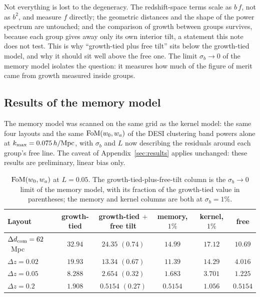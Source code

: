 \documentclass[11pt]{article}
\begin{document}
Not everything is lost to the degeneracy.  The redshift-space terms
scale as $b\,f$, not as $b^2$, and measure $f$ directly; the
geometric distances and the shape of the power spectrum are
untouched; and the comparison of growth between groups survives,
because each group gives away only its own interior tilt, a
statement this note does not test.  This is
why ``growth-tied plus free tilt'' sits below the growth-tied model,
and why it should sit well above the free one.  The limit
$\sigma_b \to 0$ of the memory model isolates the question: it
measures how much of the figure of merit came from growth measured
inside groups.

\subsection{Results of the memory model}
\label{sec:memresults}

The memory model was scanned on the same grid as the kernel model:
the same four layouts and the same ${\rm FoM}(w_0, w_a)$ of the DESI
clustering band powers alone at
$k_{\rm max} = 0.075\,h/{\rm Mpc}$, with $\sigma_b$ and $L$ now
describing the residuals around each group's free line.  The caveat
of Appendix~\ref{sec:results} applies unchanged: these results are
preliminary, linear bias only.

\begin{table}[ht]
  \centering
  \setlength{\tabcolsep}{4.5pt}
  \begin{tabular}{lccccc}
    \hline
    Layout & growth-tied & growth-tied $+$ free tilt & memory, $1\%$ &
    kernel, $1\%$ & free \\
    \hline
    $\Delta d_{\rm com} = 62$~Mpc & $32.94$ & $24.35$ $(0.74)$ &
    $14.99$ & $17.12$ & $10.69$ \\
    $\Delta z = 0.02$ & $19.93$ & $13.34$ $(0.67)$ &
    $11.39$ & $14.29$ & $4.016$ \\
    $\Delta z = 0.05$ & $8.288$ & $2.654$ $(0.32)$ &
    $1.683$ & $3.701$ & $1.225$ \\
    $\Delta z = 0.2$  & $1.908$ & $0.5154$ $(0.27)$ &
    $0.5154$ & $1.056$ & $0.5154$ \\
    \hline
  \end{tabular}
  \caption{${\rm FoM}(w_0, w_a)$ at $L = 0.05$.  The
    growth-tied-plus-free-tilt column is the $\sigma_b \to 0$ limit of
    the memory model, with its fraction of the growth-tied value in
    parentheses; the memory and kernel columns are both at
    $\sigma_b = 1\%$.}
  \label{tab:memside}
\end{table}
\end{document}

